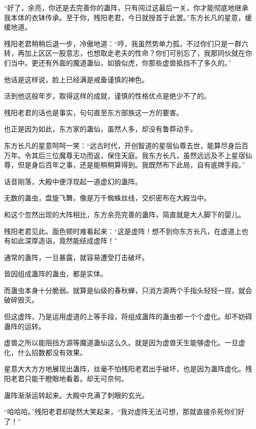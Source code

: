 
\begin{this_body}

“好了，余亮，你还是去完善你的蛊阵，只有闯过这最后一关，你才能彻底地继承我本体的衣钵传承。至于你，残阳老君，今日就授首于此罢。”东方长凡的星意，缓缓地道。

残阳老君稍稍后退一步，冷傲地道：“哼，我虽然势单力孤，不过你们只是一群六转，再加上区区一股意志，也想取走老夫的性命？你们可别忘了，我那同伙就在你们当中。更还有外面的魔道蛊仙，如狼似虎，你那些虚兽抵挡不了多久的。”

他话是这样说，脸上已经满是戒备谨慎的神色。

活到他这般年岁，取得这样的成就，谨慎的性格优点是绝少不了的。

残阳老君的话也是事实，句句直至东方部族这一方的要害。

也正是因为如此，东方家的蛊仙，虽然人多，却没有鲁莽动手。

东方长凡的星意呵呵一笑：“远古时代，开创智道的星宿仙尊去世，能算尽身后百万年。令其后三位魔尊无功而返，保住天庭。我东方长凡，虽然远远及不上星宿仙尊，但是身后百年之事，还是能稍稍算得到。我既然布下此局，自有底牌手段。”

话音刚落，大殿中便浮现起一道虚幻的蛊阵。

无数的蛊虫，盘旋飞舞，像是万千蜘蛛丝线，交织密布在大殿当中。

和这个忽然出现的大阵相比，东方余亮完善的蛊阵，简直就是大人脚下的婴儿。

残阳老君见此。面色顿时难看起来：“这是虚阵！想不到你东方长凡，在虚道上也有如此深厚造诣，竟然能结成虚阵！”

通常的蛊阵，一旦暴露，就容易遭受打击破坏。

皆因组成蛊阵的蛊虫，都是实体。

而蛊虫本身十分脆弱。就算是仙级的春秋蝉，只消方源两个手指头轻轻一捏，就会破碎毁灭。

但这虚阵，乃是运用虚道的上等手段，将组成蛊阵的蛊虫都一个个虚化。却不妨碍蛊阵的运转。

虚兽之所以能阻挡方源等魔道蛊仙这么久。就是因为虚兽天生能够虚化。一旦虚化，什么招数都没有效果。

星意大大方方地展现出蛊阵，丝毫不怕残阳老君出手破坏，也是因为蛊阵虚化。残阳老君只能干瞪眼地看着。却无可奈何。

蛊阵渐渐运转起来。大殿中充满了刺眼的玄光。

“哈哈哈。”残阳老君却陡然大笑起来，“我对虚阵无法可想，那就直接杀死你们好了！”


\end{this_body}
